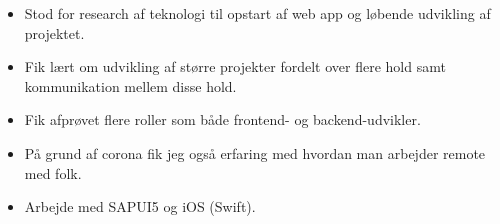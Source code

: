 \documentclass[10pt,a4paper,ragged2e,dvipsnames]{altacv}
\begin{document}

    \begin{fullwidth}
      \makecvheader
    \end{fullwidth}



    \begin{itemize}
      \item Stod for research af teknologi til opstart af web app og løbende udvikling af projektet.
      \item Fik lært om udvikling af større projekter fordelt over flere hold samt kommunikation mellem
        disse hold.
      \item Fik afprøvet flere roller som både frontend- og backend-udvikler.
      \item På grund af corona fik jeg også erfaring med hvordan man arbejder remote med folk.
    \end{itemize}

    \divider

    \begin{itemize}
      \item Arbejde med SAPUI5 og iOS (Swift).
    \end{itemize}
\end{document}
